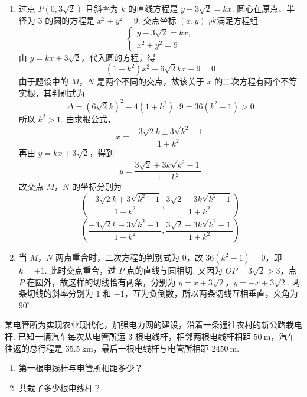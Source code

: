 \begin{solution}
\begin{enumerate}
\item 过点 \(P\left(0,3\sqrt{2}\right)\) 且斜率为 \(k\) 的直线方程是 \(y-3\sqrt{2}=kx\). 圆心在原点、半径为 \(3\) 的圆的方程是 \(x^2+y^2=9\). 交点坐标 \((x,y)\) 应满足方程组
\[
\begin{cases}
y-3\sqrt{2}=kx,\\
x^2+y^2=9
\end{cases}
\]
由 \(y=kx+3\sqrt{2}\)，代入圆的方程，得
\[
(1+k^2)x^2+6\sqrt{2}kx+9=0
\]
由于题设中的 \(M\)，\(N\) 是两个不同的交点，故该关于 \(x\) 的二次方程有两个不等实根，其判别式为
\[
\Delta=(6\sqrt{2}k)^2-4(1+k^2)\cdot9=36(k^2-1)>0
\]
所以 \(k^2>1\). 由求根公式，
\[
x=\frac{-3\sqrt{2}k\pm3\sqrt{k^2-1}}{1+k^2}
\]
再由 \(y=kx+3\sqrt{2}\)，得到
\[
y=\frac{3\sqrt{2}\pm3k\sqrt{k^2-1}}{1+k^2}
\]
故交点 \(M\)，\(N\) 的坐标分别为
\[
\left( \frac{-3\sqrt{2}k+3\sqrt{k^2-1}}{1+k^2},\frac{3\sqrt{2}+3k\sqrt{k^2-1}}{1+k^2} \right)
\]
\[
\left( \frac{-3\sqrt{2}k-3\sqrt{k^2-1}}{1+k^2},\frac{3\sqrt{2}-3k\sqrt{k^2-1}}{1+k^2} \right)
\]

\setcounter{enumi}{2}
\item 当 \(M\)，\(N\) 两点重合时，二次方程的判别式为 \(0\)，故
\(36(k^2-1)=0\)，即 \(k=\pm1\). 此时交点重合，过 \(P\) 点的直线与圆相切. 又因为
\(OP=3\sqrt{2}>3\)，点 \(P\) 在圆外，故这样的切线恰有两条，分别为
\(y=x+3\sqrt{2}\)，\(y=-x+3\sqrt{2}\).
两条切线的斜率分别为 \(1\) 和 \(-1\)，互为负倒数，所以两条切线互相垂直，夹角为 \(90^\circ\).
\end{enumerate}
\end{solution}

\begin{problem}
某电管所为实现农业现代化，加强电力网的建设，沿着一条通往农村的新公路栽电杆. 已知一辆汽车每次从电管所运 \(3\) 根电线杆，相邻两根电线杆相距 \(50\mathrm{~m}\)，汽车往返的总行程是 \(35.5\mathrm{~km}\)，最后一根电线杆与电管所相距 \(2450\mathrm{~m}\).

\begin{enumerate}
\item 第一根电线杆与电管所相距多少？
\item 共栽了多少根电线杆？
\end{enumerate}
\end{problem}

